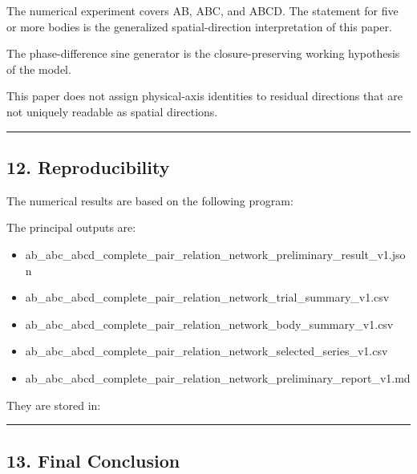 \documentclass[
  10pt,
  a4paper,
]{article}
\providecommand{\tightlist}{%
  \setlength{\itemsep}{0pt}\setlength{\parskip}{0pt}}
\begin{document}
The numerical experiment covers AB, ABC, and ABCD. The statement for
five or more bodies is the generalized spatial-direction interpretation
of this paper.

The phase-difference sine generator is the closure-preserving working
hypothesis of the model.

This paper does not assign physical-axis identities to residual
directions that are not uniquely readable as spatial directions.

\begin{center}\rule{0.5\linewidth}{0.5pt}\end{center}

\subsection{12. Reproducibility}\label{reproducibility}

The numerical results are based on the following program:


The principal outputs are:

\begin{itemize}
\tightlist
\item
  ab\_abc\_abcd\_complete\_pair\_relation\_network\_preliminary\_result\_v1.json
\item
  ab\_abc\_abcd\_complete\_pair\_relation\_network\_trial\_summary\_v1.csv
\item
  ab\_abc\_abcd\_complete\_pair\_relation\_network\_body\_summary\_v1.csv
\item
  ab\_abc\_abcd\_complete\_pair\_relation\_network\_selected\_series\_v1.csv
\item
  ab\_abc\_abcd\_complete\_pair\_relation\_network\_preliminary\_report\_v1.md
\end{itemize}

They are stored in:


\begin{center}\rule{0.5\linewidth}{0.5pt}\end{center}

\subsection{13. Final Conclusion}\label{final-conclusion}
\end{document}
